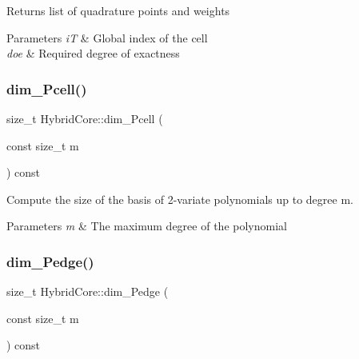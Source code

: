 \begin{DoxyReturn}{Returns}
list of quadrature points and weights 
\end{DoxyReturn}

\begin{DoxyParams}{Parameters}
{\em iT} & Global index of the cell \\
\hline
{\em doe} & Required degree of exactness \\
\hline
\end{DoxyParams}
\mbox{\label{classHArDCore2D_1_1HybridCore_aa2bdc59d150566e1b992058031509d2f}} 
\subsubsection{\texorpdfstring{dim\+\_\+\+Pcell()}{dim\_Pcell()}}
{\footnotesize\ttfamily size\+\_\+t Hybrid\+Core\+::dim\+\_\+\+Pcell (\begin{DoxyParamCaption}\item[{const size\+\_\+t}]{m }\end{DoxyParamCaption}) const}



Compute the size of the basis of 2-\/variate polynomials up to degree m. 


\begin{DoxyParams}{Parameters}
{\em m} & The maximum degree of the polynomial \\
\hline
\end{DoxyParams}
\mbox{\label{classHArDCore2D_1_1HybridCore_ab0fb57313f27fb8b4a6e9747de1d5cfe}} 
\subsubsection{\texorpdfstring{dim\+\_\+\+Pedge()}{dim\_Pedge()}}
{\footnotesize\ttfamily size\+\_\+t Hybrid\+Core\+::dim\+\_\+\+Pedge (\begin{DoxyParamCaption}\item[{const size\+\_\+t}]{m }\end{DoxyParamCaption}) const}



